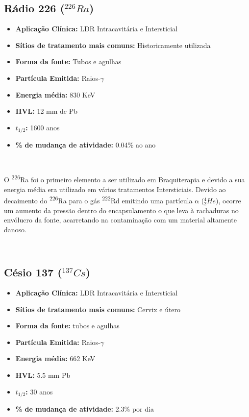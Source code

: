 \documentclass[11pt,a4paper]{article}
\begin{document}
			
		\subsection{Rádio 226 \textbf{\textcolor{CarnationPink}{(${}^{226}Ra$)}}}\label{sec:radio226}
			
			
			\begin{itemize}
				\item \textbf{Aplicação Clínica:} LDR Intracavitária e Intersticial
				\item \textbf{Sítios de tratamento mais comuns:} Historicamente utilizada
				\item \textbf{Forma da fonte:} Tubos e agulhas
				\item \textbf{Partícula Emitida:} Raios-$\gamma$
				\item \textbf{Energia média: } 830 KeV
				\item \textbf{HVL:} 12 mm de Pb
				\item \textbf{$t_{1/2}$:} 1600 anos
				\item \textbf{\% de mudança de atividade: } 0.04\% ao ano
			\end{itemize}
			
			\

			O \textsuperscript{226}Ra foi o primeiro elemento a ser utilizado em Braquiterapia e devido a sua energia média era utilizado em vários tratamentos Intersticiais. Devido ao decaimento do \textsuperscript{226}Ra para o gás \textsuperscript{222}Rd emitindo uma partícula $\mathrm{\alpha}$ (${}_2^4He$), ocorre um aumento da pressão dentro do encapsulamento o que leva à rachaduras no envólucro da fonte, acarretando na contaminação com um material altamente danoso.

			\
		
		\subsection{Césio 137 \textbf{\textcolor{CarnationPink}{(${}^{137}Cs$)}}}

			\begin{itemize}
				\item \textbf{Aplicação Clínica:} LDR Intracavitária e Intersticial
				\item \textbf{Sítios de tratamento mais comuns:} Cervix e útero
				\item \textbf{Forma da fonte:} tubos e agulhas
				\item \textbf{Partícula Emitida:} Raios-$\gamma$
				\item \textbf{Energia média: } 662 KeV
				\item \textbf{HVL:} 5.5 mm Pb
				\item \textbf{$t_{1/2}$:} 30 anos
				\item \textbf{\% de mudança de atividade: } 2.3\% por dia
			\end{itemize}
\end{document}
